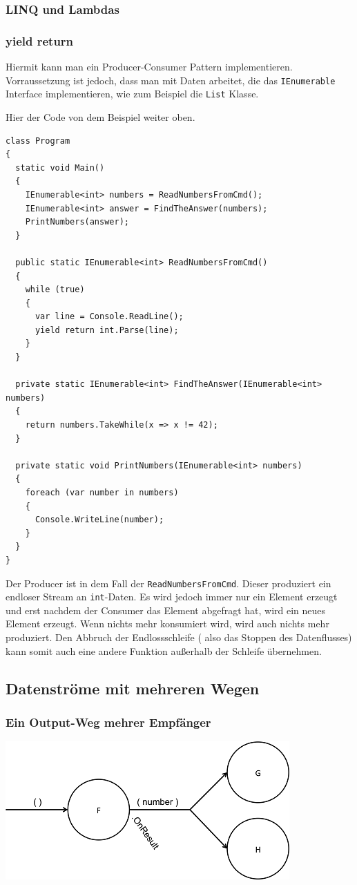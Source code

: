 \documentclass[11pt]{article}
\begin{document}
\subsubsection{LINQ und Lambdas}
\label{sec:orgheadline27}
\subsubsection{yield return}
\label{sec:orgheadline28}
Hiermit kann man ein Producer-Consumer Pattern implementieren.
Vorraussetzung ist jedoch, dass man mit Daten arbeitet, die das \texttt{IEnumerable} Interface implementieren, wie zum Beispiel die
\texttt{List} Klasse.

Hier der Code von dem Beispiel weiter oben.

\begin{verbatim}
class Program
{
  static void Main()
  {
    IEnumerable<int> numbers = ReadNumbersFromCmd();
    IEnumerable<int> answer = FindTheAnswer(numbers);
    PrintNumbers(answer);
  }

  public static IEnumerable<int> ReadNumbersFromCmd()
  {
    while (true)
    {
      var line = Console.ReadLine();
      yield return int.Parse(line);
    }
  }

  private static IEnumerable<int> FindTheAnswer(IEnumerable<int> numbers)
  {
    return numbers.TakeWhile(x => x != 42);
  }

  private static void PrintNumbers(IEnumerable<int> numbers)
  {
    foreach (var number in numbers)
    {
      Console.WriteLine(number);
    }
  }
}
\end{verbatim}

Der Producer ist in dem Fall der \texttt{ReadNumbersFromCmd}.
Dieser produziert ein endloser Stream an \texttt{int}-Daten.
Es wird jedoch immer nur ein Element erzeugt und erst nachdem der Consumer das
Element abgefragt hat, wird ein neues Element erzeugt.
Wenn nichts mehr konsumiert wird, wird auch nichts mehr produziert.
Den Abbruch der Endlossschleife ( also das Stoppen des Datenflusses) kann somit auch eine andere Funktion außerhalb der Schleife
übernehmen.




\subsection{Datenströme mit mehreren Wegen}
\label{sec:orgheadline33}
\subsubsection{Ein Output-Weg mehrer Empfänger}
\label{sec:orgheadline30}
\includegraphics[width=.9\linewidth]{./img/diagramOut1to2.png}
\end{document}
